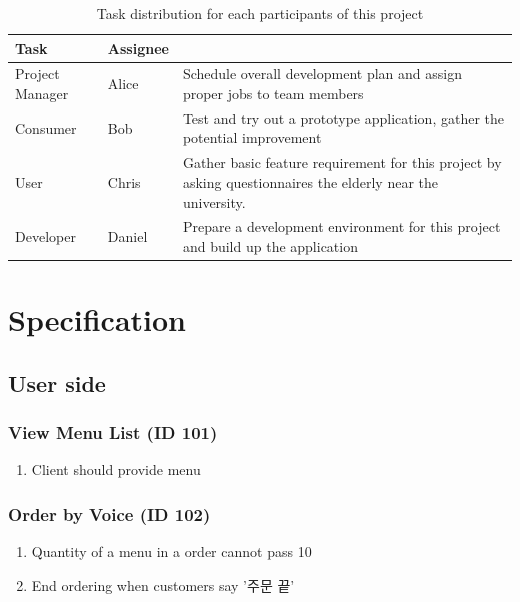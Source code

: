 \documentclass[conference,compsoc]{IEEEtran}
\begin{document}
\begin{table}[ht!] \renewcommand\arraystretch{1.25}
  \begin{threeparttable}
      \caption{Task distribution  for each participants of this project%
      \label{tab:table1}}    %
      \begin{tabular}{@{}l l>{\raggedright\arraybackslash}p{4.7cm}@{}}
      \toprule
      \bfseries Task & \bfseries Assignee & \multicolumn{1}{l}{\bfseries Description} \\
      \midrule
      Project Manager & Alice & Schedule overall development plan and assign proper jobs to team members \\ 
      Consumer & Bob & Test and try out a prototype application, gather the potential improvement \\ 
      User & Chris & Gather basic feature requirement for this project by asking questionnaires the elderly near the university. \\ 
      Developer & Daniel & Prepare a development environment for this project and build up the application \\
      \bottomrule
      \end{tabular}
  \end{threeparttable}
\end{table}

\section{Specification}

\subsection{User side}

\subsubsection{View Menu List (ID 101)}
\begin{enumerate}
  \item Client should provide menu  
\end{enumerate}

\subsubsection{Order by Voice (ID 102)}
\begin{enumerate}
  \item Quantity of a menu in a order cannot pass 10
  \item End ordering when customers say '주문 끝'  
\end{enumerate}
\end{document}
